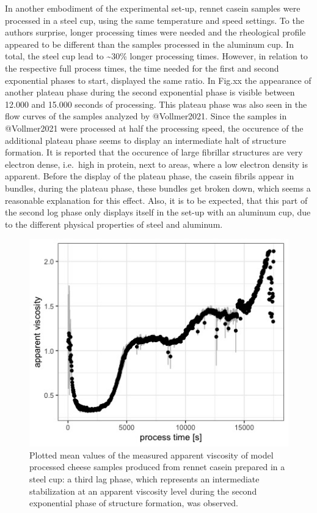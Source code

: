 \documentclass[
]{article}
\begin{document}
In another embodiment of the experimental set-up, rennet casein samples
were processed in a steel cup, using the same temperature and speed
settings. To the authors surprise, longer processing times were needed
and the rheological profile appeared to be different than the samples
processed in the aluminum cup. In total, the steel cup lead to
\textasciitilde30\% longer processing times. However, in relation to the
respective full process times, the time needed for the first and second
exponential phases to start, displayed the same ratio. In Fig.xx the
appearance of another plateau phase during the second exponential phase
is visible between 12.000 and 15.000 seconds of processing. This plateau
phase was also seen in the flow curves of the samples analyzed by
@Vollmer2021. Since the samples in @Vollmer2021 were processed at half
the processing speed, the occurence of the additional plateau phase
seems to display an intermediate halt of structure formation. It is
reported that the occurence of large fibrillar structures are very
electron dense, i.e.~high in protein, next to areas, where a low
electron density is apparent. Before the display of the plateau phase,
the casein fibrils appear in bundles, during the plateau phase, these
bundles get broken down, which seems a reasonable explanation for this
effect. Also, it is to be expected, that this part of the second log
phase only displays itself in the set-up with an aluminum cup, due to
the different physical properties of steel and aluminum.

\begin{figure}
\includegraphics[width=0.5\linewidth]{plots/6.1_visco.mean.steel} \caption[Structure formation in a steel cup]{Plotted mean values of the measured apparent viscosity of model processed cheese samples produced from rennet casein prepared in a steel cup: a third lag phase, which represents an intermediate stabilization at an apparent viscosity level during the second exponential phase of structure formation, was observed.}\label{fig:unnamed-chunk-13}
\end{figure}
\end{document}

